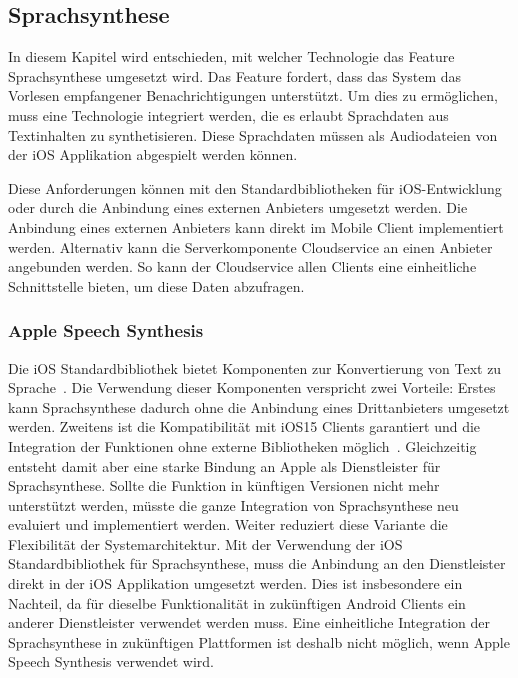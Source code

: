\subsection{Sprachsynthese}

In diesem Kapitel wird entschieden, mit welcher Technologie das Feature Sprachsynthese umgesetzt wird.
Das Feature fordert, dass das System das Vorlesen empfangener Benachrichtigungen unterstützt.
Um dies zu ermöglichen, muss eine Technologie integriert werden, die es erlaubt Sprachdaten aus Textinhalten zu synthetisieren.
Diese Sprachdaten müssen als Audiodateien von der iOS Applikation abgespielt werden können.

Diese Anforderungen können mit den Standardbibliotheken für iOS-Entwicklung oder durch die Anbindung eines externen Anbieters umgesetzt werden.
Die Anbindung eines externen Anbieters kann direkt im Mobile Client implementiert werden.
Alternativ kann die Serverkomponente Cloudservice an einen Anbieter angebunden werden.
So kann der Cloudservice allen Clients eine einheitliche Schnittstelle bieten, um diese Daten abzufragen.

\subsubsection{Apple Speech Synthesis}

Die iOS Standardbibliothek bietet Komponenten zur Konvertierung von Text zu Sprache~\cite{ios_speech_synthesis}.
Die Verwendung dieser Komponenten verspricht zwei Vorteile:
Erstes kann Sprachsynthese dadurch ohne die Anbindung eines Drittanbieters umgesetzt werden.
Zweitens ist die Kompatibilität mit iOS15 Clients garantiert und die Integration der Funktionen ohne externe Bibliotheken möglich~\cite{ios_speech_synthesis}.
Gleichzeitig entsteht damit aber eine starke Bindung an Apple als Dienstleister für Sprachsynthese.
Sollte die Funktion in künftigen Versionen nicht mehr unterstützt werden, müsste die ganze Integration von Sprachsynthese neu evaluiert und implementiert werden.
Weiter reduziert diese Variante die Flexibilität der Systemarchitektur.
Mit der Verwendung der iOS Standardbibliothek für Sprachsynthese, muss die Anbindung an den Dienstleister direkt in der iOS Applikation umgesetzt werden.
Dies ist insbesondere ein Nachteil, da für dieselbe Funktionalität in zukünftigen Android Clients ein anderer Dienstleister verwendet werden muss.
Eine einheitliche Integration der Sprachsynthese in zukünftigen Plattformen ist deshalb nicht möglich, wenn Apple Speech Synthesis verwendet wird.

